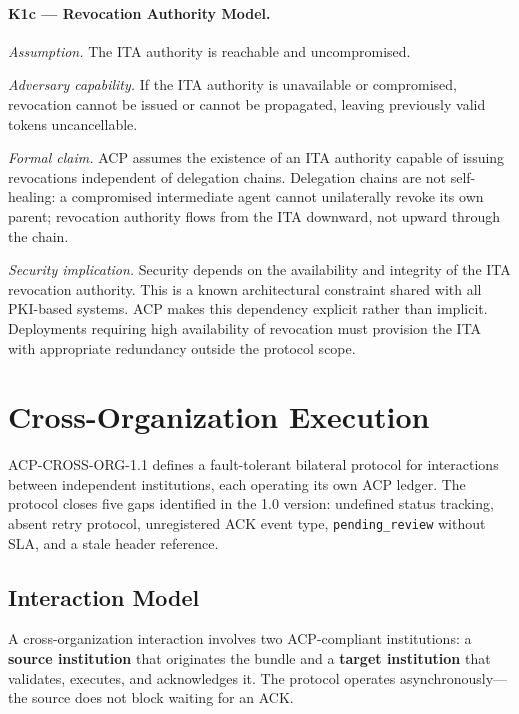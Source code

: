 \documentclass[11pt]{article}
\theoremstyle{definition}
\begin{document}
\paragraph{K1c --- Revocation Authority Model.}

\textit{Assumption.}
The ITA authority is reachable and uncompromised.

\textit{Adversary capability.}
If the ITA authority is unavailable or compromised, revocation cannot be issued
or cannot be propagated, leaving previously valid tokens uncancellable.

\textit{Formal claim.}
ACP assumes the existence of an ITA authority capable of issuing revocations
independent of delegation chains.
Delegation chains are not self-healing:
a compromised intermediate agent cannot unilaterally revoke its own parent;
revocation authority flows from the ITA downward, not upward through the chain.

\textit{Security implication.}
Security depends on the availability and integrity of the ITA revocation authority.
This is a known architectural constraint shared with all PKI-based systems.
ACP makes this dependency explicit rather than implicit.
Deployments requiring high availability of revocation must provision the ITA
with appropriate redundancy outside the protocol scope.

\section{Cross-Organization Execution}

ACP-CROSS-ORG-1.1 defines a fault-tolerant bilateral protocol for interactions between
independent institutions, each operating its own ACP ledger.
The protocol closes five gaps identified in the 1.0 version: undefined status tracking,
absent retry protocol, unregistered ACK event type, \texttt{pending\_review} without SLA,
and a stale header reference.

\subsection{Interaction Model}

A cross-organization interaction involves two ACP-compliant institutions:
a \textbf{source institution} that originates the bundle and a \textbf{target institution}
that validates, executes, and acknowledges it.
The protocol operates asynchronously---the source does not block waiting for an ACK.
\end{document}
